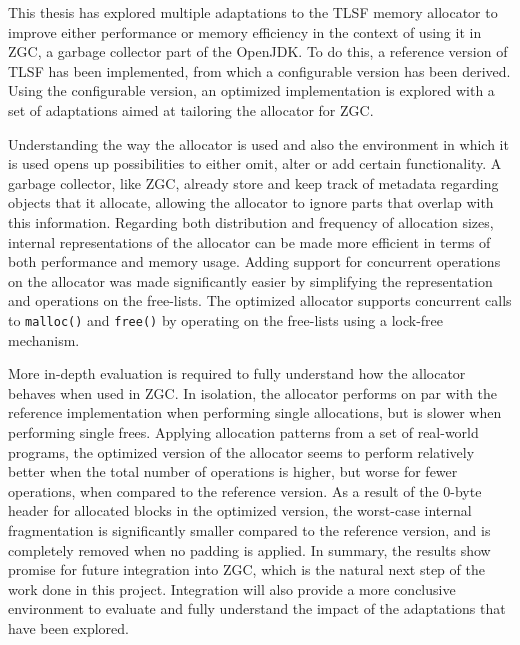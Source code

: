 
This thesis has explored multiple adaptations to the TLSF memory allocator to improve either performance or memory efficiency in the context of using it in ZGC, a garbage collector part of the OpenJDK. To do this, a reference version of TLSF has been implemented, from which a configurable version has been derived. Using the configurable version, an optimized implementation is explored with a set of adaptations aimed at tailoring the allocator for ZGC.

Understanding the way the allocator is used and also the environment in which it is used opens up possibilities to either omit, alter or add certain functionality. A garbage collector, like ZGC, already store and keep track of metadata regarding objects that it allocate, allowing the allocator to ignore parts that overlap with this information. Regarding both distribution and frequency of allocation sizes, internal representations of the allocator can be made more efficient in terms of both performance and memory usage. Adding support for concurrent operations on the allocator was made significantly easier by simplifying the representation and operations on the free-lists. The optimized allocator supports concurrent calls to \texttt{malloc()} and \texttt{free()} by operating on the free-lists using a lock-free mechanism.

More in-depth evaluation is required to fully understand how the allocator behaves when used in ZGC. In isolation, the allocator performs on par with the reference implementation when performing single allocations, but is slower when performing single frees. Applying allocation patterns from a set of real-world programs, the optimized version of the allocator seems to perform relatively better when the total number of operations is higher, but worse for fewer operations, when compared to the reference version. As a result of the 0-byte header for allocated blocks in the optimized version, the worst-case internal fragmentation is significantly smaller compared to the reference version, and is completely removed when no padding is applied. In summary, the results show promise for future integration into ZGC, which is the natural next step of the work done in this project. Integration will also provide a more conclusive environment to evaluate and fully understand the impact of the adaptations that have been explored.

